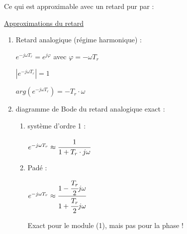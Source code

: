 \vspace{0.5cm}


\vspace{3mm}

Ce qui est approximable avec un retard pur par : 

\vspace{3mm}

\underline{Approximations du retard}

\begin{enumerate}
    \item Retard analogique (régime harmonique) :
    
        $e^{-j \omega T_r} = e^{j\varphi}$ avec $\varphi = - \omega T_r$

        $|e^{-j\omega T_r}| = 1$

        $arg(e^{-j\omega T_r}) = -T_r \cdot \omega$

    \item diagramme de Bode du retard analogique exact : 
        \begin{enumerate}
            \item système d'ordre 1 : 
            
                $e^{-j\omega T_r}  \approx \cfrac{1}{1+T_r\cdot j\omega}$

            \item Padé : 
                
                $e^{-j\omega T_r}  \approx \cfrac{1-\cfrac{T_r}{2}j\omega}{1+\cfrac{T_r}{2}j\omega}$

            Exact pour le module (1), mais pas pour la phase !

        \end{enumerate}
\end{enumerate}